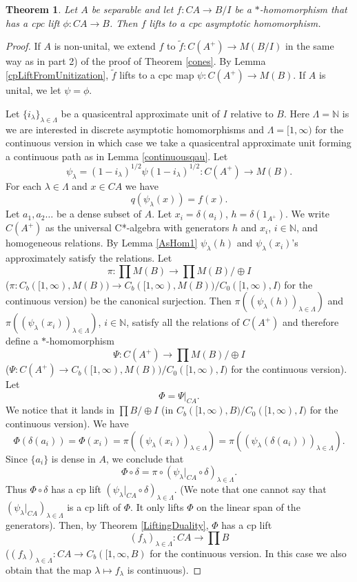 \documentclass{article}%
\newtheorem{theorem}{Theorem}
\begin{document}
\begin{theorem}\label{ccp}   Let $A$ be separable and let $f: CA \to B/I$ be a $\ast$-homomorphism that has a cpc lift $\phi: CA \to B$.
 Then $f$ lifts to a cpc  asymptotic homomorphism.
  \end{theorem}
  \begin{proof} If $A$ is non-unital, we extend $f$ to $\tilde f: C(A^+)\to M(B/I)$ in the same way as in part 2) of the proof of Theorem \ref{cones}.
  By Lemma \ref{cpLiftFromUnitization}, $\tilde f$ lifts to a cpc map $ \psi: C(A^+)\to M(B)$. If $A$ is unital, we let $\psi = \phi$.



  Let $\{i_{\lambda}\}_{\lambda\in \Lambda}$ be  a quasicentral approximate unit of $I$ relative to $B$. Here $\Lambda=\mathbb N$ is we are interested in discrete asymptotic homomorphisms and $\Lambda = [1, \infty)$ for the continuous version in which case we take a quasicentral approximate unit forming a continuous path as in Lemma \ref{continuousqau}.
Let $$\psi_{\lambda} = (1-i_{\lambda})^{1/2} \psi (1-i_{\lambda})^{1/2}: C(A^+)\to M(B).$$ For each $\lambda\in \Lambda$ and $x\in CA$ we have $$q(\psi_{\lambda}(x)) = f(x).$$
 Let  $ a_1, a_2 \ldots$ be a dense subset of $A$. Let $x_i = \delta(a_i)$, $h = \delta(1_{A^+})$.
We write $C(A^+)$ as the universal C*-algebra with generators $h$ and $x_i$, $i\in \mathbb N$, and homogeneous relations.   By Lemma \ref{AsHom1}  $\psi_{\lambda}(h)$ and $\psi_{\lambda}(x_i)$'s approximately satisfy the relations.  Let $$\pi: \prod M(B) \to \prod M(B) /\oplus I$$ ($\pi: C_b([1, \infty), M(B))\to C_b([1, \infty), M(B))/C_0([1, \infty), I)$ for the continuous version) be the canonical surjection. Then $\pi\left((\psi_{\lambda}(h))_{\lambda\in \Lambda}\right)$ and  $\pi\left((\psi_{\lambda}(x_i))_{\lambda\in \Lambda}\right)$, $i\in \mathbb N$, satisfy all the relations of $C(A^+)$ and therefore define a $\ast$-homomorphism
$$\Psi: C(A^+) \to \prod M(B)/\oplus I$$ ($\Psi: C(A^+) \to C_b([1, \infty), M(B))/C_0([1, \infty), I)$ for the continuous version). Let
$$\Phi = \Psi|_{CA}.$$ We notice that it lands in $\prod B/\oplus I$ (in $C_b([1, \infty), B)/C_0([1, \infty), I)$ for the continuous version). We have
$$\Phi(\delta(a_i)) = \Phi(x_i) = \pi\left((\psi_{\lambda}(x_i))_{\lambda\in \Lambda}\right) =  \pi\left((\psi_{\lambda}(\delta(a_i)))_{\lambda\in \Lambda}\right). $$ Since $\{a_i\}$ is dense in $A$, we conclude that
$$\Phi\circ \delta =\pi\circ \left(\psi_{\lambda}|_{CA}\circ \delta\right)_{\lambda\in \Lambda}.$$
Thus $\Phi\circ \delta$ has a cp lift $\left(\psi_{\lambda}|_{CA}\circ \delta\right)_{\lambda\in \Lambda}$. (We note that one cannot say that $\left(\psi_{\lambda}|_{CA}\right)_{\lambda\in \Lambda}$ is a cp lift of $\Phi$. It only lifts $\Phi$ on the linear span of the generators). Then, by Theorem \ref{LiftingDuality}, $\Phi$ has a cp lift
 $$\left(f_{\lambda}\right)_{\lambda\in\Lambda}: CA \to \prod B$$ ($\left(f_{\lambda}\right)_{\lambda\in\Lambda}: CA \to C_b([1, \infty, B)$ for the continuous version. In this case we also obtain that the map $\lambda\mapsto f_{\lambda}$ is continuous).




\end{proof}
\end{document}
